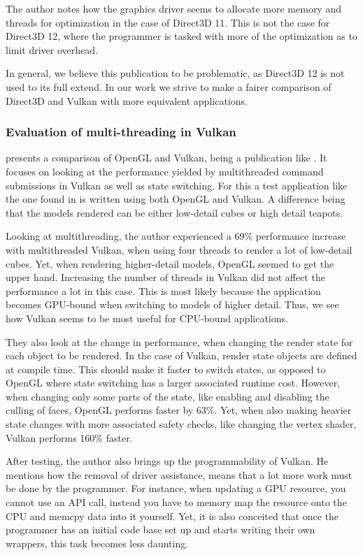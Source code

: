 The author  notes how the graphics driver seems to allocate more memory and threads for optimization in the case of Direct3D 11.
This is not the case for Direct3D 12, where the programmer is tasked with more of the optimization as to limit driver overhead.


In general, we believe this publication to be problematic, as Direct3D 12 is not used to its full extend.
In our work we strive to make a fairer comparison of Direct3D and Vulkan with more equivalent applications.

\subsubsection{Evaluation of multi-threading in Vulkan}
\citet{blackert_2016_evaluation} presents a comparison of OpenGL and Vulkan, being a publication like \cite{2016_direct3d}.
It focuses on looking at the performance yielded by multithreaded command submissions in Vulkan as well as state switching.
For this a test application like the one found in \cite{dobersberger_2015_reducing} is written using both OpenGL and Vulkan.
A difference being that the models rendered can be either low-detail cubes or high detail teapots.


Looking at multithreading, the author experienced a 69\% performance increase with multithreaded Vulkan, when using four threads to render a lot of low-detail cubes.
Yet, when rendering higher-detail models, OpenGL seemed to get the upper hand.
Increasing the number of threads in Vulkan did not affect the performance a lot in this case.
This is most likely because the application becomes \gls{GPU}-bound when switching to models of higher detail.
Thus, we see how Vulkan seems to be most useful for CPU-bound applications.


They also look at the change in performance, when changing the render state for each object to be rendered.
In the case of Vulkan, render state objects are defined at compile time.
This should make it faster to switch states, as opposed to OpenGL where state switching has a larger associated runtime cost.
However, when changing only some parts of the state, like enabling and disabling the culling of faces, OpenGL performs faster by 63\%.
Yet, when also making heavier state changes with more associated safety checks, like changing the vertex shader, Vulkan performs 160\% faster.


After testing, the author also brings up the programmability of Vulkan. 
He mentions how the removal of driver assistance, means that a lot more work must be done by the programmer. 
For instance, when updating a \gls{GPU} resource, you cannot use an \gls{API} call, instead you have to memory map the resource onto the \gls{CPU} and memcpy data into it yourself. 
Yet, it is also conceited that once the programmer has an initial code base set up and starts writing their own wrappers, this task becomes less daunting.


